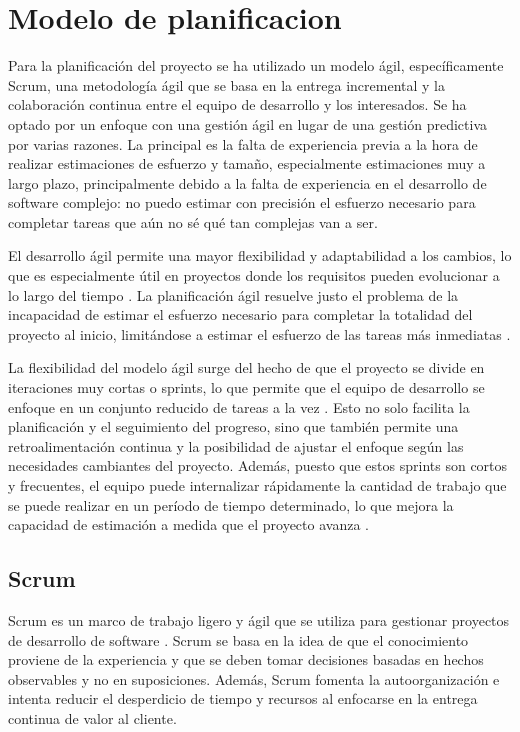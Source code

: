 \chapter{Modelo de planificacion}
\label{anexo3:cap:modelo}
Para la planificación del proyecto se ha utilizado un modelo ágil, específicamente Scrum, una
metodología ágil que se basa en la entrega incremental y la colaboración continua entre
el equipo de desarrollo y los interesados. Se ha optado por un enfoque con una gestión ágil en lugar
de una gestión predictiva por varias razones. La principal es la falta de experiencia previa a
la hora de realizar estimaciones de esfuerzo y tamaño, especialmente estimaciones muy a largo
plazo, principalmente debido a la falta de experiencia en el desarrollo de software complejo:
no puedo estimar con precisión el esfuerzo necesario para completar tareas que aún no sé
qué tan complejas van a ser.

El desarrollo ágil permite una mayor flexibilidad y adaptabilidad a los cambios, lo que es
especialmente útil en proyectos donde los requisitos pueden evolucionar a lo largo del tiempo
\parencites{AgileManifesto}{abrahamsson2017agile}. La planificación ágil resuelve justo
el problema de la incapacidad de estimar el esfuerzo necesario para completar la totalidad del
proyecto al inicio, limitándose a estimar el esfuerzo de las tareas más inmediatas
\parencite{robert2003agile}.

La flexibilidad del modelo ágil surge del hecho de que el proyecto se divide en iteraciones muy
cortas o sprints, lo que permite que el equipo de desarrollo se enfoque en un conjunto reducido
de tareas a la vez \parencite{AgileManifesto}. Esto no solo facilita la planificación y el
seguimiento del progreso, sino que también permite una retroalimentación continua y la posibilidad
de ajustar el enfoque según las necesidades cambiantes del proyecto. Además, puesto que estos sprints
son cortos y frecuentes, el equipo puede internalizar rápidamente la cantidad de trabajo que se puede
realizar en un período de tiempo determinado, lo que mejora la capacidad de estimación a medida que
el proyecto avanza \parencite{robert2003agile}.


\section{Scrum}
\label{anexo3:sec:scrum}
Scrum es un marco de trabajo ligero y ágil que se utiliza para gestionar proyectos de
desarrollo de software \parencite{schwaber2020scrum}. Scrum se basa en la idea de que el
conocimiento proviene de la experiencia y que se deben tomar decisiones basadas en hechos
observables y no en suposiciones. Además, Scrum fomenta la autoorganización e intenta reducir
el desperdicio de tiempo y recursos al enfocarse en la entrega continua de valor al cliente.

